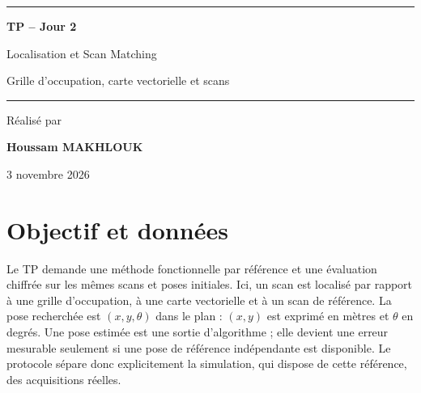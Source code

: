 \documentclass[11pt,a4paper]{article}
\begin{document}
\hypersetup{pageanchor=false}
\begin{titlepage}\centering
\vspace*{1cm}{\Large\bfseries EIGSI\par}
\vspace{.4cm}{\large Année universitaire 2026/2027\par}
\vspace{2cm}{\large RAPPORT DE TRAVAUX PRATIQUES\par}
\vspace{.8cm}\rule{.9\textwidth}{1pt}\par\vspace{.6cm}
{\Huge\bfseries TP -- Jour 2\par}\vspace{.6cm}
{\LARGE Localisation et Scan Matching\par}\vspace{.6cm}
{\large Grille d'occupation, carte vectorielle et scans\par}
\vspace{.6cm}\rule{.9\textwidth}{1pt}
\vfill{\large Réalisé par\par}\vspace{.3cm}
{\LARGE\bfseries Houssam MAKHLOUK\par}
\vspace{.4cm}{\large Étudiant à EIGSI\par}
\vfill{\large 3 novembre 2026\par}
\end{titlepage}
\hypersetup{pageanchor=true}
\tableofcontents\clearpage{}

\section{Objectif et données}
Le TP demande une méthode fonctionnelle par référence et une évaluation chiffrée
sur les mêmes scans et poses initiales. Ici, un scan est localisé par rapport à
une grille d'occupation, à une carte vectorielle et à un scan de référence.
La pose recherchée est $(x,y,\theta)$ dans le plan : $(x,y)$ est exprimé en
mètres et $\theta$ en degrés. Une pose estimée est une sortie d'algorithme ;
elle devient une erreur mesurable seulement si une pose de référence
indépendante est disponible. Le protocole sépare donc explicitement la
simulation, qui dispose de cette référence, des acquisitions réelles.
\end{document}
